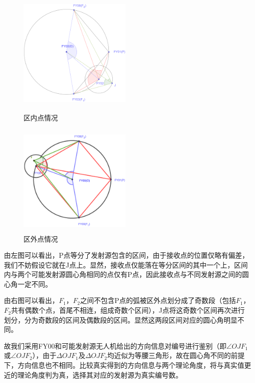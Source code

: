 \documentclass{ctexart}
\begin{document}
\begin{figure}[htbp]
  \begin{minipage}[t]{0.45\linewidth}
  \centering
  \includegraphics[height=5.5cm,width=5.5cm]{pic/error_circle1(1).eps}
  \caption{区内点情况}
  \label{区内点情况}
  \end{minipage}%
  \begin{minipage}[t]{0.45\linewidth}
  \centering
  \includegraphics[height=5.5cm,width=5.5cm]{pic/error_circle2.eps}
  \caption{区外点情况}
  \label{区外点情况}
  \end{minipage}
  \end{figure}


由左图可以看出，P点等分了发射源包含的区间，由于接收点的位置仅略有偏差，我们不妨假设它就在J点上。显然，接收点仅能落在等分区间的其中一个上，区间内与两个可能发射源圆心角相同的点仅有P点，因此接收点与不同发射源之间的圆心角一定不同。

由右图可以看出，$F_1$，$F_2$之间不包含P点的弧被区外点划分成了奇数段（包括$F_1$，$F_2$共有偶数个点，首尾不相连，组成奇数个区间），J点将这奇数个区间再次进行划分，分为奇数段的区间及偶数段的区间。显然这两段区间对应的圆心角明显不同。

故我们采用FY00和可能发射源无人机给出的方向信息对编号进行鉴别（即$\angle OJF_1$或$\angle OJF_2$），由于$\Delta OJF_1$及$\Delta OJF_2$均近似为等腰三角形，故在圆心角不同的前提下，方向信息也不相同。比较真实得到的方向信息与两个理论角度，将与真实值更近的理论角度判为真，选择其对应的发射源为真实编号数。
\end{document}
